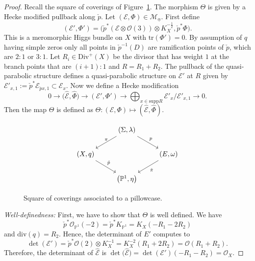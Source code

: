 \documentclass[pdftex]{sigma}
\numberwithin{equation}{section}
\theoremstyle{definition}
\newcommand{\supp}{\mathrm{supp}}
\renewcommand{\div}{\mathrm{div}}
\newcommand{\Div}{\mathrm{Div}}
\renewcommand{\to}{\rightarrow}
\newcommand{\ualpha}{\underline{\alpha}}
\newcommand{\calE}{\mathcal{E}}
\newcommand{\calM}{\mathcal{M}}
\newcommand{\calO}{\mathcal{O}}
\newcommand{\PP}{\mathbb{P}}
\newcommand{\tr}{\mathrm{tr}}
\begin{document}
\begin{proof}
 Recall the square of coverings of Figure~\ref{fig:square-of-covers}. The morphism $\Theta$ is given by a Hecke modified pullback along $\check{p}$. Let $(\calE,\Phi) \in \calM_{\ualpha}$. First define
 \[ (\calE',\Phi')= \bigl(\check{p}^*(\calE\otimes\calO(3))\otimes K_X^{-\frac12}, \check{p}^*\Phi\bigr).
 \]
 This is a meromorphic Higgs bundle on $X$ with $\tr(\Phi')=0$. By assumption of $q$ having simple zeros only all points in $\check{p}^{-1}(D)$ are ramification points of $\check{p}$, which are $2:1$ or $3:1$. Let $R_i \in \Div^+(X)$ be the divisor that has weight $1$ at the branch points that are $(i+1):1$ and $R=R_1 +R_2$. The pullback of the quasi-parabolic structure defines a quasi-parabolic structure on $\calE'$ at $R$ given by $\calE'_{x,1}:=\check{p}^*\calE_{\check{p}x,1} \subset \calE_{x}$. Now we define a Hecke modification
 \[ 0 \to \bigl(\hat{\calE},\hat{\Phi}\bigr) \to (\calE',\Phi') \to \bigoplus_{x \in \supp R} \calE'_{x}/\calE'_{x,1} \to 0.
 \]
 Then the map $\Theta$ is defined as
 $\Theta\colon (\calE,\Phi) \mapsto (\hat{\calE},\hat{\Phi})$.

 \begin{figure}[h]
$$
 \begin{tikzcd}
	& (\Sigma,\lambda) \ar[rd,"p"] \ar[ld,"\pi" above]& \\ (X,q) \ar[rd,"\check{p}"] & & (E, \omega) \ar[ld,"\check{\pi}"] \\ & \bigl(\PP^1,\eta\bigr) &
 \end{tikzcd}\vspace{-3mm}
$$
 \caption{Square of coverings associated to a pillowcase.}\label{fig:square-of-covers}
 \end{figure}

 \textit{Well-definedness:} First, we have to show that $\Theta$ is well defined. We have
 \[ \check{p}^*\calO_{\PP^1}(-2)=\check{p}^*K_{\PP^1}=K_X(-R_1-2R_2)
 \]
 and $\div(q)=R_2$. Hence, the determinant of $E'$ computes to
 \[ \det(\calE')=\check{p}^*\calO(2) \otimes K_X^{-1}=K_X^{-2}(R_1+2R_2)=\calO(R_1+R_2).
 \]
 Therefore, the determinant of $\hat{\calE}$ is $\det\bigl(\hat{\calE}\bigr)=\det(\calE')(-R_1-R_2)=\calO_X$.


\end{proof}
\end{document}
